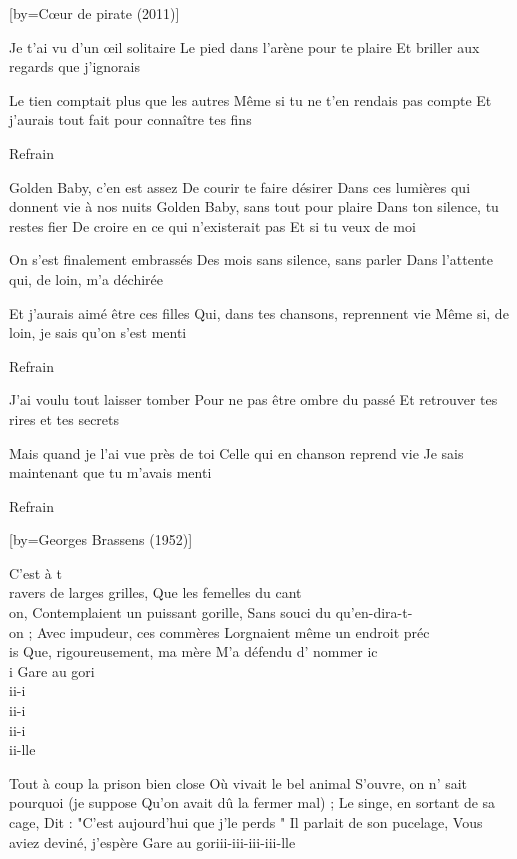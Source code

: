 [by={Cœur de pirate (2011)}]

\beginverse
Je t’ai vu d’un œil solitaire
Le pied dans l’arène pour te plaire
Et briller aux regards que j’ignorais
\endverse

\beginverse
Le tien comptait plus que les autres
Même si tu ne t’en rendais pas compte
Et j’aurais tout fait pour connaître tes fins
\endverse

\beginverse
Refrain
\endverse

\beginverse
Golden Baby, c’en est assez
De courir te faire désirer
Dans ces lumières qui donnent vie à nos nuits
Golden Baby, sans tout pour plaire
Dans ton silence, tu restes fier
De croire en ce qui n’existerait pas
Et si tu veux de moi
\endverse

\beginverse
On s’est finalement embrassés
Des mois sans silence, sans parler
Dans l’attente qui, de loin, m’a déchirée
\endverse

\beginverse
Et j’aurais aimé être ces filles
Qui, dans tes chansons, reprennent vie
Même si, de loin, je sais qu’on s’est menti
\endverse

\beginverse
Refrain
\endverse

\beginverse
J’ai voulu tout laisser tomber
Pour ne pas être ombre du passé
Et retrouver tes rires et tes secrets
\endverse

\beginverse
Mais quand je l’ai vue près de toi
Celle qui en chanson reprend vie
Je sais maintenant que tu m’avais menti
\endverse

\beginverse
Refrain
\endverse

[by={Georges Brassens (1952)}]

\beginverse
C'est à t\\[Ré]ravers de larges grilles,
Que les femelles du cant\\[La7]on,
Contemplaient un puissant gorille,
Sans souci du qu'en-dira-t-\\[Ré]on ;
Avec impudeur, ces commères
Lorgnaient même un endroit préc\\[La7]is
Que, rigoureusement, ma mère
M'a défendu d’ nommer ic\\[Ré]i
Gare au gori\\[Ré]ii-i\\[La7]ii-i\\[Ré]ii-i\\[La7]ii-lle \!
\endverse

\beginverse
Tout à coup la prison bien close
Où vivait le bel animal
S'ouvre, on n' sait pourquoi (je suppose
Qu'on avait dû la fermer mal) ;
Le singe, en sortant de sa cage,
Dit : "C'est aujourd'hui que j'le perds \!"
Il parlait de son pucelage,
Vous aviez deviné, j'espère \!
Gare au goriii-iii-iii-iii-lle \!
\endverse

